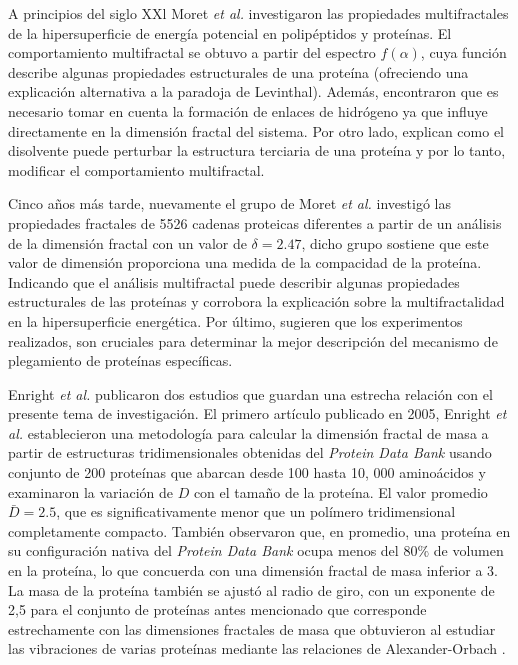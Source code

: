 A principios del siglo XXl Moret \textit{et al.}\cite{Moret2001} investigaron las propiedades multifractales de la hipersuperficie de energía potencial en polipéptidos y proteínas. El comportamiento multifractal se obtuvo a partir del espectro $f(\alpha)$, cuya función describe algunas propiedades estructurales de una proteína (ofreciendo una explicación alternativa a la paradoja de Levinthal). Además, encontraron que es necesario tomar en cuenta la formación de enlaces de hidrógeno ya que influye directamente en la dimensión fractal del sistema. Por otro lado, explican como el disolvente puede perturbar la estructura terciaria de una proteína y por lo tanto, modificar el comportamiento multifractal.

Cinco años más tarde, nuevamente el grupo de Moret \textit{et al.} \cite{Moret2005} investigó las propiedades fractales de 5526 cadenas proteicas diferentes a partir de un análisis de la dimensión fractal con un valor de $\delta = 2.47$, dicho grupo sostiene que este valor de dimensión proporciona una medida de la compacidad de la proteína. Indicando que el análisis multifractal puede describir algunas propiedades estructurales de las proteínas y corrobora la explicación sobre la multifractalidad en la hipersuperficie energética. Por último, sugieren que los experimentos realizados, son cruciales para determinar la mejor descripción del mecanismo de plegamiento de proteínas específicas.

Enright \textit{et al.} publicaron dos estudios que guardan una estrecha relación con el presente tema de investigación. El primero artículo publicado en 2005, Enright \textit{et al.}
\cite{Enright2005} establecieron una metodología  para calcular la dimensión fractal de masa a partir de estructuras tridimensionales obtenidas del \textit{Protein Data Bank} usando conjunto de 200 proteínas que abarcan desde 100 hasta 10, 000 aminoácidos y examinaron la variación de $D$ con el tamaño de la proteína. El valor promedio $\bar{D} = 2.5$, que es significativamente menor que un polímero tridimensional completamente compacto. También observaron que, en promedio, una proteína en su configuración nativa del \textit{Protein Data Bank} ocupa menos del $80\%$ de volumen en la proteína, lo que concuerda con una dimensión fractal de masa inferior a 3. La masa de la proteína también se ajustó al radio de giro, con un exponente de 2,5 para el conjunto de proteínas antes mencionado que corresponde estrechamente con las dimensiones fractales de masa que obtuvieron al estudiar las vibraciones de varias proteínas mediante las relaciones de Alexander-Orbach \cite{Alexander1982}.
 

